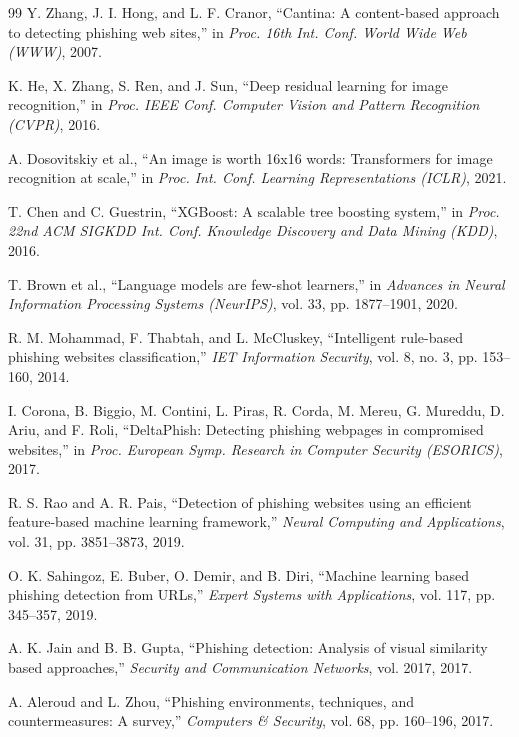 \documentclass[12pt,a4paper]{report}
\begin{document}
\begin{thebibliography}{99}
Y. Zhang, J. I. Hong, and L. F. Cranor, ``Cantina: A content-based approach to detecting phishing web sites,'' in \textit{Proc. 16th Int. Conf. World Wide Web (WWW)}, 2007.

K. He, X. Zhang, S. Ren, and J. Sun, ``Deep residual learning for image recognition,'' in \textit{Proc. IEEE Conf. Computer Vision and Pattern Recognition (CVPR)}, 2016.

A. Dosovitskiy et al., ``An image is worth 16x16 words: Transformers for image recognition at scale,'' in \textit{Proc. Int. Conf. Learning Representations (ICLR)}, 2021.

T. Chen and C. Guestrin, ``XGBoost: A scalable tree boosting system,'' in \textit{Proc. 22nd ACM SIGKDD Int. Conf. Knowledge Discovery and Data Mining (KDD)}, 2016.

T. Brown et al., ``Language models are few-shot learners,'' in \textit{Advances in Neural Information Processing Systems (NeurIPS)}, vol. 33, pp. 1877--1901, 2020.

R. M. Mohammad, F. Thabtah, and L. McCluskey, ``Intelligent rule-based phishing websites classification,'' \textit{IET Information Security}, vol. 8, no. 3, pp. 153--160, 2014.

I. Corona, B. Biggio, M. Contini, L. Piras, R. Corda, M. Mereu, G. Mureddu, D. Ariu, and F. Roli, ``DeltaPhish: Detecting phishing webpages in compromised websites,'' in \textit{Proc. European Symp. Research in Computer Security (ESORICS)}, 2017.

R. S. Rao and A. R. Pais, ``Detection of phishing websites using an efficient feature-based machine learning framework,'' \textit{Neural Computing and Applications}, vol. 31, pp. 3851--3873, 2019.

O. K. Sahingoz, E. Buber, O. Demir, and B. Diri, ``Machine learning based phishing detection from URLs,'' \textit{Expert Systems with Applications}, vol. 117, pp. 345--357, 2019.

A. K. Jain and B. B. Gupta, ``Phishing detection: Analysis of visual similarity based approaches,'' \textit{Security and Communication Networks}, vol. 2017, 2017.

A. Aleroud and L. Zhou, ``Phishing environments, techniques, and countermeasures: A survey,'' \textit{Computers \& Security}, vol. 68, pp. 160--196, 2017.

\end{thebibliography}
\end{document}
